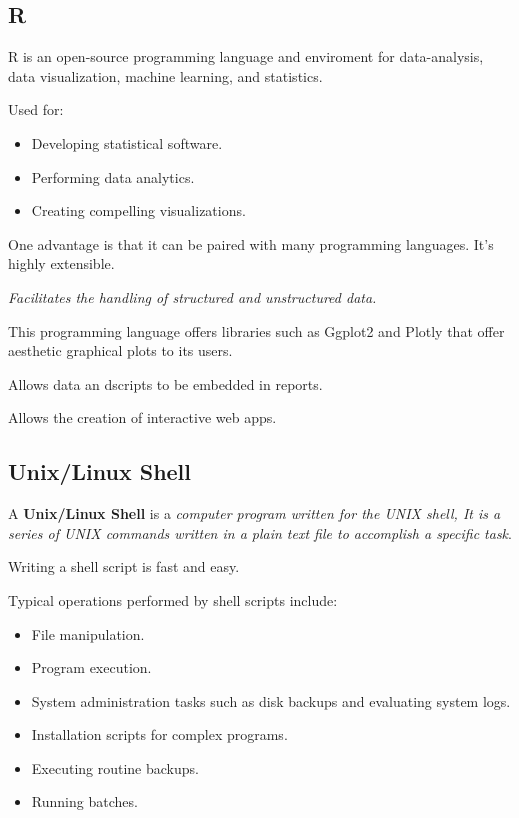 \documentclass[../../ibm_data_analysis.tex]{subfiles}
\begin{document}
    \subsection{R}

    R is an open-source programming language and enviroment for data-analysis, data visualization, machine learning, and statistics.

    Used for:
    \begin{itemize}
        \item Developing statistical software.
        \item Performing data analytics.
        \item Creating compelling visualizations.
    \end{itemize}

    One advantage is that it can be paired with many programming languages. It's highly extensible.
    
    \begin{center}
        \textit{Facilitates the handling of structured and unstructured data.}
    \end{center}

    \begin{obs}
        This programming language offers libraries such as Ggplot2 and Plotly that offer aesthetic graphical plots to its users.

        Allows data an dscripts to be embedded in reports.

        Allows the creation of interactive web apps.
    \end{obs}

    \subsection{Unix/Linux Shell}

    \begin{mydef}
        A \textbf{Unix/Linux Shell} is a \textit{computer program written for the UNIX shell, It is a series of UNIX commands written in a plain text file to accomplish a specific task}.
    \end{mydef}

    Writing a shell script is fast and easy.

    \begin{obs}
        Typical operations performed by shell scripts include:
        \begin{itemize}
            \item File manipulation.
            \item Program execution.
            \item System administration tasks such as disk backups and evaluating system logs.
            \item Installation scripts for complex programs.
            \item Executing routine backups.
            \item Running batches.
        \end{itemize}
    \end{obs}
\end{document}
